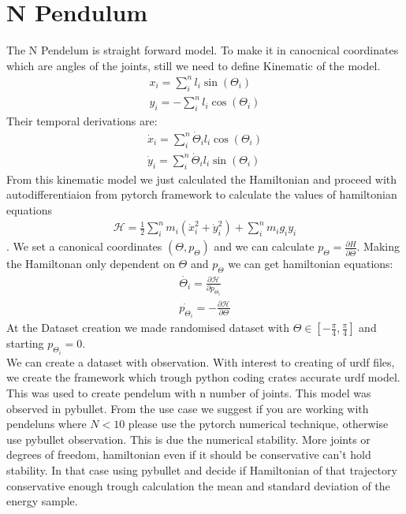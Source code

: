 	


 
 \section{N Pendulum}
 The N Pendelum is straight forward model.
 To make it in canocnical coordinates which are angles of the joints, still we need to define Kinematic of the model.
 \begin{eqnarray}
 	x_i = \sum_i^n l_i\sin(\Theta_i)\\
 	y_i = -\sum_i^n l_i\cos(\Theta_i)
 \end{eqnarray}
Their temporal derivations are:
\begin{eqnarray}
\dot{x}_i = \sum_i^n \dot{\Theta}_i l_i\cos(\Theta_i)\\
	\dot{y}_i = \sum_i^n \dot{\Theta}_i l_i\sin(\Theta_i)
 \end{eqnarray}
From this kinematic model we just calculated the Hamiltonian and proceed with autodifferentiaion from pytorch framework to calculate the values of hamiltonian equations
\begin{eqnarray}
	\mathcal{H} = \frac{1}{2}\sum_i^n m_i (\dot{x}_i^2 + \dot{y}_i^2) + \sum_i^n m_ig_iy_i 
\end{eqnarray}.
We set a canonical coordinates $(\Theta, p_{\Theta})$ and we can calculate $p_{\Theta} = \frac{\partial H}{\partial \dot{\Theta}}$.
Making the Hamiltonan only dependent on $\Theta$ and $p_{\Theta}$ we can get hamiltonian equations:
\begin{eqnarray}
	\dot{\Theta_i} = \frac{\partial \mathcal{H}}{\partial p_{\Theta_i}}\\
	\dot{p_{\Theta_i}} = -\frac{\partial \mathcal{H}}{\partial \Theta}
\end{eqnarray}
At the Dataset creation we made randomised dataset with $\Theta \in [-\frac{\pi}{4},\frac{\pi}{4}]$ and starting $p_{\Theta_i} = 0 $.\\
We can create a dataset with observation. With interest to creating of urdf files, we create the framework which trough python coding crates accurate urdf model. This was used to create pendelum with n number of joints. This model was observed in pybullet. From the use case we suggest if you are working with pendeluns where $N<10$ please use the pytorch numerical technique, otherwise use pybullet observation. This is due the numerical stability. More joints or degrees of freedom, hamiltonian even if it should be conservative can't hold stability. In that case using pybullet and decide if Hamiltonian of that trajectory conservative enough trough calculation the mean and standard deviation of the energy sample. 





 
 


 

